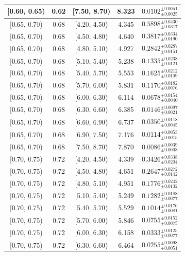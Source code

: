 \begin{longtable}{|c|c|c|c|c|}
\hline
[0.60, 0.65) & 0.62 & [7.50, 8.70) & 8.323 & $0.0102^{ \pm 0.0051 }_{ \pm 0.0025 }$ \\ 
\hline
[0.65, 0.70) & 0.68 & [4.20, 4.50) & 4.345 & $0.5898^{ \pm 0.0430 }_{ \pm 0.0317 }$ \\ 
\hline
[0.65, 0.70) & 0.68 & [4.50, 4.80) & 4.640 & $0.3817^{ \pm 0.0334 }_{ \pm 0.0190 }$ \\ 
\hline
[0.65, 0.70) & 0.68 & [4.80, 5.10) & 4.927 & $0.2842^{ \pm 0.0287 }_{ \pm 0.0151 }$ \\ 
\hline
[0.65, 0.70) & 0.68 & [5.10, 5.40) & 5.238 & $0.1335^{ \pm 0.0238 }_{ \pm 0.0121 }$ \\ 
\hline
[0.65, 0.70) & 0.68 & [5.40, 5.70) & 5.553 & $0.1625^{ \pm 0.0212 }_{ \pm 0.0109 }$ \\ 
\hline
[0.65, 0.70) & 0.68 & [5.70, 6.00) & 5.831 & $0.1170^{ \pm 0.0182 }_{ \pm 0.0076 }$ \\ 
\hline
[0.65, 0.70) & 0.68 & [6.00, 6.30) & 6.114 & $0.0678^{ \pm 0.0154 }_{ \pm 0.0040 }$ \\ 
\hline
[0.65, 0.70) & 0.68 & [6.30, 6.60) & 6.385 & $0.0146^{ \pm 0.0097 }_{ \pm 0.0021 }$ \\ 
\hline
[0.65, 0.70) & 0.68 & [6.60, 6.90) & 6.737 & $0.0350^{ \pm 0.0118 }_{ \pm 0.0045 }$ \\ 
\hline
[0.65, 0.70) & 0.68 & [6.90, 7.50) & 7.176 & $0.0114^{ \pm 0.0053 }_{ \pm 0.0015 }$ \\ 
\hline
[0.65, 0.70) & 0.68 & [7.50, 8.70) & 7.870 & $0.0086^{ \pm 0.0039 }_{ \pm 0.0008 }$ \\ 
\hline
[0.70, 0.75) & 0.72 & [4.20, 4.50) & 4.339 & $0.3426^{ \pm 0.0338 }_{ \pm 0.0204 }$ \\ 
\hline
[0.70, 0.75) & 0.72 & [4.50, 4.80) & 4.651 & $0.2647^{ \pm 0.0272 }_{ \pm 0.0142 }$ \\ 
\hline
[0.70, 0.75) & 0.72 & [4.80, 5.10) & 4.951 & $0.1776^{ \pm 0.0242 }_{ \pm 0.0132 }$ \\ 
\hline
[0.70, 0.75) & 0.72 & [5.10, 5.40) & 5.249 & $0.1282^{ \pm 0.0188 }_{ \pm 0.0077 }$ \\ 
\hline
[0.70, 0.75) & 0.72 & [5.40, 5.70) & 5.529 & $0.1014^{ \pm 0.0176 }_{ \pm 0.0081 }$ \\ 
\hline
[0.70, 0.75) & 0.72 & [5.70, 6.00) & 5.846 & $0.0755^{ \pm 0.0152 }_{ \pm 0.0075 }$ \\ 
\hline
[0.70, 0.75) & 0.72 & [6.00, 6.30) & 6.158 & $0.0333^{ \pm 0.0125 }_{ \pm 0.0077 }$ \\ 
\hline
[0.70, 0.75) & 0.72 & [6.30, 6.60) & 6.464 & $0.0255^{ \pm 0.0098 }_{ \pm 0.0051 }$ \\ 

\end{longtable}
